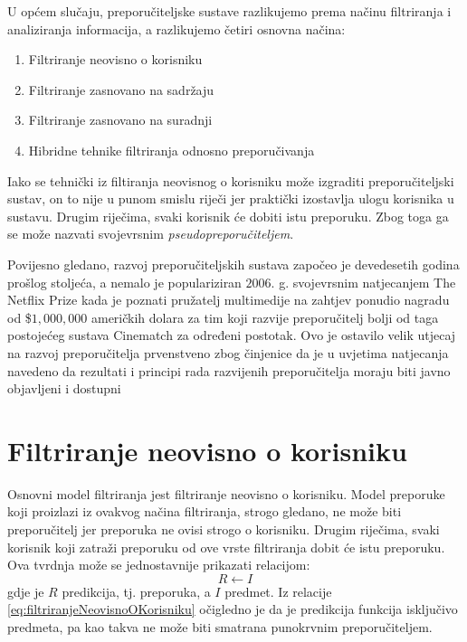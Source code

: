 \documentclass[times, utf8, diplomski, numeric]{fer}
\begin{document}
U općem slučaju, preporučiteljske sustave razlikujemo prema načinu filtriranja i
analiziranja informacija, a razlikujemo četiri osnovna načina:
\begin{enumerate}
  \item Filtriranje neovisno o korisniku 
  \item Filtriranje zasnovano na sadržaju 
  \item Filtriranje zasnovano na suradnji 
  \item Hibridne tehnike filtriranja odnosno preporučivanja
\end{enumerate}
Iako se tehnički iz filtiranja neovisnog o korisniku može izgraditi
preporučiteljski sustav, on to nije u punom smislu riječi jer praktički
izostavlja ulogu korisnika u sustavu. Drugim riječima, svaki korisnik će dobiti
istu preporuku. Zbog toga ga se može nazvati svojevrsnim
\emph{pseudopreporučiteljem}.

Povijesno gledano, razvoj preporučiteljskih sustava započeo je devedesetih
godina prošlog stoljeća, a nemalo je populariziran $2006$. g. svojevrsnim
natjecanjem \glqq The Netflix Prize \grqq kada je poznati pružatelj multimedije
na zahtjev ponudio nagradu od \$$1,000,000$ američkih dolara za tim koji razvije
preporučitelj bolji od taga postojećeg sustava \glqq Cinematch \grqq za određeni
postotak.
Ovo je ostavilo velik utjecaj na razvoj preporučitelja prvenstveno zbog
činjenice da je u uvjetima natjecanja navedeno da rezultati i principi rada
razvijenih preporučitelja moraju biti javno objavljeni i dostupni

\section{Filtriranje neovisno o korisniku}
Osnovni model filtriranja jest filtriranje neovisno o korisniku. Model preporuke
koji proizlazi iz ovakvog načina filtriranja, strogo gledano, ne može biti
preporučitelj jer preporuka ne ovisi strogo o korisniku. Drugim riječima, svaki
korisnik koji zatraži preporuku od ove vrste filtriranja dobit će istu
preporuku. Ova tvrdnja može se jednostavnije prikazati relacijom:
\begin{equation}
\label{eq:filtriranjeNeovisnoOKorisniku}
	R \leftarrow I
\end{equation}
gdje je $R$ predikcija, tj. preporuka, a $I$ predmet. Iz relacije
\ref{eq:filtriranjeNeovisnoOKorisniku} očigledno je da je predikcija funkcija
isključivo predmeta, pa kao takva ne može biti smatrana punokrvnim
preporučiteljem.
\end{document}
